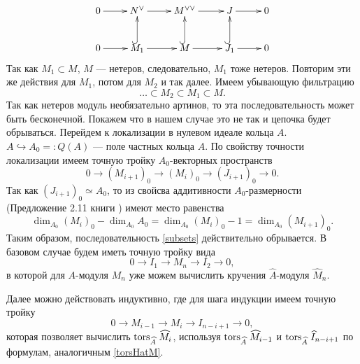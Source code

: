     \begin{equation*}
        \xymatrix{
            0 \ar[r]
            &N^\vee \ar[r] 
            &M^{\vee \vee} \ar[r] 
            &J \ar[r]
            &0\\
            0 \ar[r]
            &M_1 \ar@{^{(}->}[u]\ar[r]
            &M \ar@{^{(}->}[u]\ar[r]
            &J_1 \ar@{^{(}->}[u]\ar[r]
            &0
        }
    \end{equation*}
    Так как $M_1 \subset M$, $M$ --- нетеров, следовательно, $M_1$ тоже нетеров. Повторим эти же
    действия для $M_1$, потом для $M_2$ и так далее. Имеем убывающую фильтрацию
    \begin{equation} \label{subsets}
        \dots \subset M_2 \subset M_1 \subset M.
    \end{equation}
    Так как нетеров модуль необязательно артинов, то эта последовательность может быть бесконечной. Покажем 
    что в нашем случае это не так и цепочка будет обрываться. Перейдем к локализации в нулевом идеале кольца $A$. 
    $A \hookrightarrow A_0 =: Q(A)$ --- поле частных кольца $A$.
    По свойству точности локализации имеем точную тройку $A_0$-векторных пространств
    \begin{equation*}
        0 \rightarrow (M_{i+1})_0 \rightarrow (M_i)_0 \rightarrow (J_{i + 1})_0 \rightarrow 0.
    \end{equation*}
    Так как $(J_{i + 1})_0 \simeq A_0$, то из свойсва аддитивности $A_0$-размерности (Предложение 2.11 книги 
    \cite{A-M}) имеют место равенства
    \begin{equation*}
        \dim_{A_0} (M_i)_0 - \dim_{A_0}A_0 = \dim_{A_0} (M_i)_0 - 1 = \dim_{A_0}(M_{i+1})_0.
    \end{equation*}
    Таким образом, последовательность \eqref{subsets} действительно обрывается. В базовом случае будем
    иметь точную тройку вида
    \begin{equation*}
        0 \rightarrow I_1 \rightarrow M_n \rightarrow I_2 \rightarrow 0, 
    \end{equation*}
    в которой для $A$-модуля $M_n$ уже можем вычислить кручения $\hat A$-модуля $\hat M_n$.

    Далее можно действовать индуктивно, где для шага индукции имеем точную тройку 
    \begin{equation*}
        0 \rightarrow M_{i-1} \rightarrow M_i \rightarrow I_{n - i + 1} \rightarrow 0,
    \end{equation*}
    которая позволяет вычислить $\textup{tors}_{\widehat A}\;\widehat M_i$, используя $\textup{tors}_{\widehat A}\;\widehat M_{i-1}$ и
    $\textup{tors}_{\widehat A}\;\widehat I_{n - i + 1}$ по формулам, аналогичным \eqref{torsHatM}.